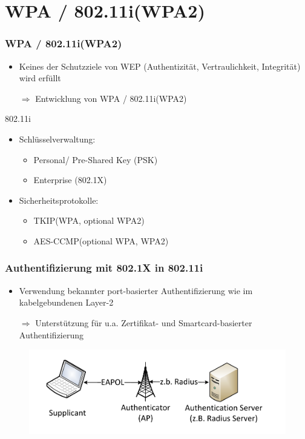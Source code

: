 \documentclass{beamer}
\begin{document}
\section{WPA / 802.11i(WPA2)}
\begin{frame}
\frametitle{WPA / 802.11i(WPA2)}
\begin{itemize}
	\item Keines der Schutzziele von WEP (Authentizität, Vertraulichkeit, Integrität) wird erfüllt
	\item[$\Rightarrow$] Entwicklung von WPA / 802.11i(WPA2)
\end{itemize}
\begin{block}{802.11i}
\begin{itemize}
	\item Schlüsselverwaltung:
	\begin{itemize}
		\item Personal/ Pre-Shared Key (PSK)
		\item Enterprise (802.1X)
	\end{itemize}
	\item Sicherheitsprotokolle:
	\begin{itemize}
		\item TKIP(WPA, optional WPA2)
		\item AES-CCMP(optional WPA, WPA2)
	\end{itemize}
\end{itemize}
\end{block}
\end{frame}

\begin{frame}
	\frametitle{Authentifizierung mit 802.1X in 802.11i}
	\begin{itemize}
		\item Verwendung bekannter port-basierter Authentifizierung wie im kabelgebundenen Layer-2
		\item[$\Rightarrow$] Unterstützung für u.a. Zertifikat- und Smartcard-basierter Authentifizierung
	\end{itemize}
	\begin{figure}
		\includegraphics[scale=0.7]{figures/ap_radius.pdf}

	\end{figure}
\end{frame}
\end{document}
